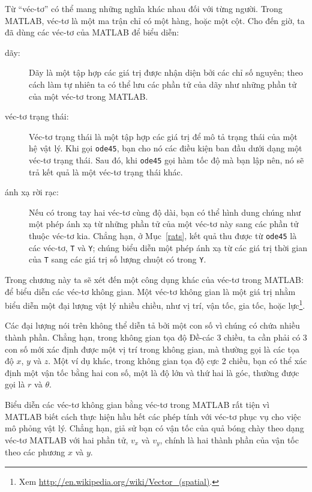 \documentclass[12pt]{book}
\begin{document}
Từ ``véc-tơ'' có thể mang những nghĩa khác nhau đối với từng người. Trong 
MATLAB, véc-tơ là một ma trận chỉ có một hàng, hoặc một cột. Cho đến giờ,
ta đã dùng các véc-tơ của MATLAB để biểu diễn:

\begin{description}

\item[dãy:] Dãy là một tập hợp các giá trị được nhận diện bởi các chỉ số 
nguyên; theo cách làm tự nhiên ta có thể lưu các phần tử của dãy như những 
phần tử của một véc-tơ trong MATLAB.

\item[véc-tơ trạng thái:] Véc-tơ trạng thái là một tập hợp các giá trị để mô tả 
trạng thái của một hệ vật lý. Khi gọi {\tt ode45}, bạn cho nó các điều kiện 
ban đầu dưới dạng một véc-tơ trạng thái. Sau đó, khi {\tt ode45} gọi hàm 
tốc độ mà bạn lập nên, nó sẽ trả kết quả là một véc-tơ trạng thái khác.

\item[ánh xạ rời rạc:] Nếu có trong tay hai véc-tơ cùng độ dài, bạn có thể hình 
dung chúng như một phép ánh xạ từ những phần tử của một véc-tơ này sang 
các phần tử thuộc véc-tơ kia. Chẳng hạn, ở Mục~\ref{rats}, kết quả thu được 
từ  {\tt ode45} là các véc-tơ, {\tt T} và {\tt Y}; chúng biểu diễn một phép 
ánh xạ từ các giá trị thời gian của {\tt T} sang các giá trị số lượng chuột có 
trong {\tt Y}.

\end{description}

Trong chương này ta sẽ xét đến một công dụng khác của véc-tơ trong MATLAB:
để biểu diễn các véc-tơ không gian. Một véc-tơ không gian là một giá trị nhằm 
biểu diễn một đại lượng vật lý nhiều chiều, như vị trí, vận tốc, gia tốc, hoặc 
lực\footnote{Xem
\url{http://en.wikipedia.org/wiki/Vector_(spatial)}.}.

Các đại lượng nói trên không thể diễn tả bởi một con số vì chúng có chứa 
nhiều thành phần. Chẳng hạn, trong không gian tọa độ Đề-các 3 chiều, ta cần 
phải có 3 con số mới xác định được một vị trí trong không gian, mà thường 
gọi là các tọa độ $x$, $y$ và $z$.  Một ví dụ khác, trong không gian tọa độ 
cực 2 chiều, bạn có thể xác định một vận tốc bằng hai con số, một là độ lớn 
và thứ hai là góc, thường được gọi là $r$ và $\theta$.

Biểu diễn các véc-tơ không gian bằng véc-tơ trong MATLAB rất tiện vì 
MATLAB biết cách thực hiện hầu hết các phép tính với véc-tơ phục vụ 
cho việc mô phỏng vật lý. Chẳng hạn, giả sử bạn có vận tốc của quả 
bóng chày theo dạng véc-tơ MATLAB với hai phần tử, $v_x$ và $v_y$,
chính là hai thành phần của vận tốc theo các phương $x$ và  $y$.
\end{document}
